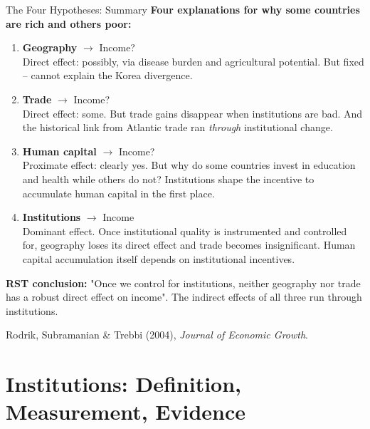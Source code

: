 \documentclass[10pt]{beamer}
\begin{document}
\begin{frame}[allowframebreaks]{The Four Hypotheses: Summary}
\textbf{Four explanations for why some countries are rich and others poor:}


\begin{enumerate}
\item \textbf{Geography} $\longrightarrow$ Income? \\[2pt]
\footnotesize Direct effect: possibly, via disease burden and agricultural potential. But fixed -- cannot explain the Korea divergence.


\item \textbf{Trade} $\longrightarrow$ Income? \\[2pt]
\footnotesize Direct effect: some. But trade gains disappear when institutions are bad. And the historical link from Atlantic trade ran \emph{through} institutional change.


\item \textbf{Human capital} $\longrightarrow$ Income? \\[2pt]
\footnotesize Proximate effect: clearly yes. But why do some countries invest in education and health while others do not? Institutions shape the incentive to accumulate human capital in the first place.


\item \textbf{Institutions} $\longrightarrow$ Income \\[2pt]
\footnotesize \alert{Dominant effect.} Once institutional quality is instrumented and controlled for, geography loses its direct effect and trade becomes insignificant. Human capital accumulation itself depends on institutional incentives.
\end{enumerate}


\textbf{RST conclusion:} "Once we control for institutions, neither geography nor trade has a robust direct effect on income". The indirect effects of all three run through institutions.


\footnotesize Rodrik, Subramanian \& Trebbi (2004), \emph{Journal of Economic Growth}.
\end{frame}

\section{Institutions: Definition, Measurement, Evidence}
\end{document}
